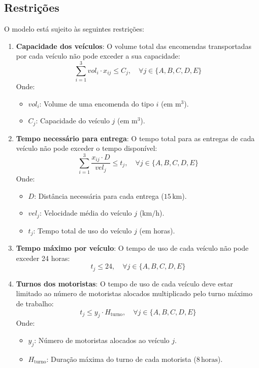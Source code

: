 \subsection{Restrições}\label{subsec:restricoes}
O modelo está sujeito às seguintes restrições:
\begin{enumerate}
    \item \textbf{Capacidade dos veículos}: O volume total das encomendas transportadas por cada veículo não pode exceder a sua capacidade:
    \[
        \sum_{i=1}^{3} vol_i \cdot x_{ij} \leq C_j, \quad \forall j \in \{A, B, C, D, E\}
    \]
    Onde:
    \begin{itemize}
        \item \( vol_i \): Volume de uma encomenda do tipo \( i \) (em \( \mathrm{m^3} \)).
        \item \( C_j \): Capacidade do veículo \( j \) (em \( \mathrm{m^3} \)).
    \end{itemize}
    \item \textbf{Tempo necessário para entrega}: O tempo total para as entregas de cada veículo não pode exceder o tempo disponível:
    \[
        \sum_{i=1}^{3} \frac{x_{ij} \cdot D}{vel_j} \leq t_j, \quad \forall j \in \{A, B, C, D, E\}
    \]
    Onde:
    \begin{itemize}
        \item \( D \): Distância necessária para cada entrega (\( 15 \, \mathrm{km} \)).
        \item \( vel_j \): Velocidade média do veículo \( j \) (\( \mathrm{km/h} \)).
        \item \( t_j \): Tempo total de uso do veículo \( j \) (em horas).
    \end{itemize}
    \item \textbf{Tempo máximo por veículo}: O tempo de uso de cada veículo não pode exceder 24 horas:
    \[
        t_j \leq 24, \quad \forall j \in \{A, B, C, D, E\}
    \]
    \item \textbf{Turnos dos motoristas}: O tempo de uso de cada veículo deve estar limitado ao número de motoristas alocados multiplicado pelo turno máximo de trabalho:
    \[
        t_j \leq y_j \cdot H_{\text{turno}}, \quad \forall j \in \{A, B, C, D, E\}
    \]
    Onde:
    \begin{itemize}
        \item \( y_j \): Número de motoristas alocados ao veículo \( j \).
        \item \( H_{\text{turno}} \): Duração máxima do turno de cada motorista (\( 8 \, \mathrm{horas} \)).

\end{itemize}
\end{enumerate}
